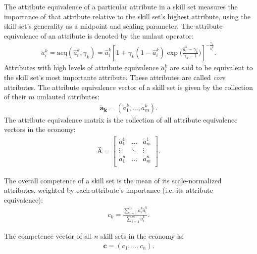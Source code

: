 \documentclass{elsarticle} %
\begin{document}
The attribute equivalence of a particular attribute in a skill set measures the
importance of that attribute relative to the skill set's highest attribute,
using the skill set's generality as a midpoint and scaling parameter. The
attribute equivalence of an attribute is denoted by the umlaut operator:
\begin{gather}
    \ddot{a}_{i}^{k} =
    \text{aeq}(\hat{a}_{i}^{k}, \gamma_{k}) =
    \hat{a}_{i}^{k}
    \left[
        1 + \gamma_{k} (1 - \hat{a}_{i}^{k})
        \exp\bigg(
        \frac{\hat{a}_{i}^{k} - \gamma_{k}}{\gamma_{k} - 1}
        \bigg)
        \right] ^ {
    -\frac{\gamma_{k}}{\hat{a}_{i}^{k}}
    }
    .
\end{gather}
Attributes with high levels of attribute equivalence $\ddot{a}_{i}^{k}$ are said to be equivalent to the skill set's most importante attribute. These attributes are called \textit{core} attributes.
The attribute equivalence vector of a skill set is given by the collection of their $m$ umlauted attributes:
\begin{gather}
    \boldsymbol{\ddot{a}_{k}} = (\ddot{a}_{1}^{k}, ..., \ddot{a}_{m}^{k})
    .
\end{gather}
The attribute equivalence matrix is the collection of all attribute equivalence vectors in the economy:
\begin{gather}
    \textbf{Ä} =
    \begin{bmatrix}
        \ddot{a}_{1}^{1} & \hdots & \ddot{a}_{m}^{1} \\
        \vdots           & \ddots & \vdots           \\
        \ddot{a}_{1}^{n} & \hdots & \ddot{a}_{m}^{n} \\
    \end{bmatrix}
    .
\end{gather}

The overall competence of a skill set is the mean of its scale-normalized
attributes, weighted by each attribute's importance (i.e. its attribute
equivalence):
\begin{gather}
    c_k =
    \frac{
    \sum_{i=1}^{m}{
    \ddot{a}_{i}^{k}
    \tilde{a}_{i}^{k}
    }
    }{
    \sum_{i=1}^{m}{
    \ddot{a}_{i}^{k}
    }
    }
    .
\end{gather}

The competence vector of all $n$ skill sets in the economy is:
\begin{gather}
    \boldsymbol{c} = (c_1, \dots, c_n)
    .
\end{gather}
\end{document}
